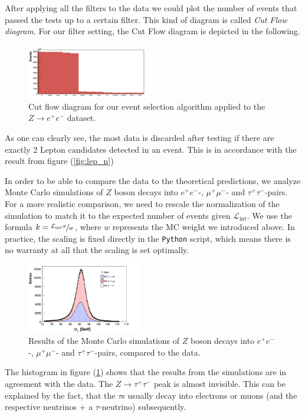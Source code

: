 \documentclass[twocolumn,
			   showpacs,%
               nofootinbib,
               aps,%
               prd,
               notitlepage,
               showkeys,
               10pt]{revtex4-1}
\begin{document}
After applying all the filters to the data we could plot the number of events that passed the tests up to a certain  filter. This kind of diagram is called \textit{Cut Flow diagram}. For our filter setting, the Cut Flow diagram is depicted in the following.

\begin{figure}[H]
\centering
\includegraphics[width = 0.5\textwidth]
{figures/plots/CutFlowEGamma_corr}
\caption{Cut flow diagram for our event selection algorithm applied to the $Z\rightarrow e^+e^-$ dataset.}	
\end{figure}
As one can clearly see, the most data is discarded after testing if there are exactly 2 Lepton candidates detected in an event. This is in accordance with the result from figure (\ref{fig:lep_n})

In order to be able to compare the data to the theoretical predictions, we analyze Monte Carlo simulations of $Z$ boson decays into $e^+e^-$-, $\mu^+\mu^-$- and $\tau^+\tau^-$-pairs. \\
For a more realistic comparison, we need to rescale the normalization of the simulation to match it to the expected number of events given $\mathcal{L}_{\text{int}}$. We use the formula $k = \sfrac{\mathcal{L}_{\text{int}}\sigma}{w}$, where $w$ represents the MC weight we introduced above. In practice, the scaling is fixed directly in the \verb|Python| script, which means there is no warranty at all that the scaling is set optimally. \\
\begin{figure}[H]
	\centering
	\includegraphics[width=0.45\textwidth]{figures/plots/HistoMCData_corr}
	\caption{Results of the Monte Carlo simulations of $Z$ boson decays into $e^+e^-$-, $\mu^+\mu^-$- and $\tau^+\tau^-$-pairs, compared to the data.}
	\label{fig:MChisto}
\end{figure}
The histogram in figure (\ref{fig:MChisto}) shows that the results from the simulations are in agreement with the data. The $Z\rightarrow \tau^+\tau^-$ peak is almost invisible. This can be explained by the fact, that the $\tau$s usually decay into electrons or muons (and the respective neutrinos + a $\tau$-neutrino) subsequently.
\end{document}
